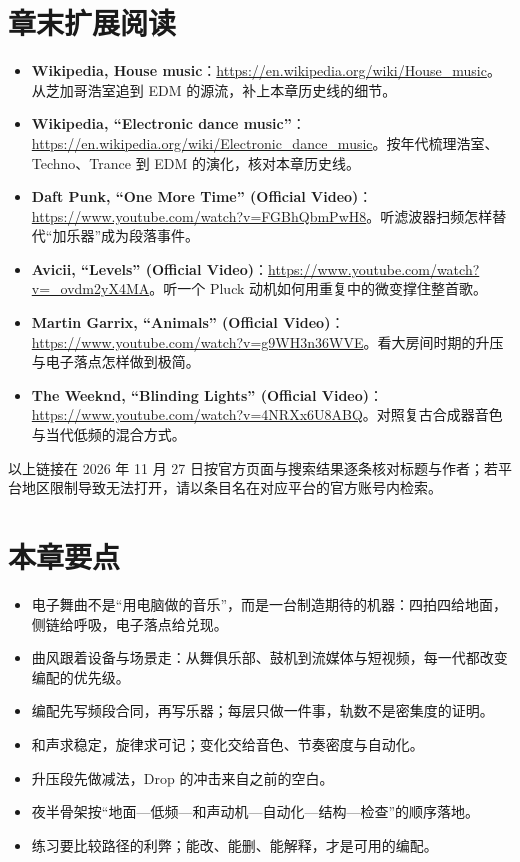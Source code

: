 \section{章末扩展阅读}
\label{sec:edm-reading}

\begin{sloppypar}
\begin{itemize}
\item \textbf{Wikipedia, House music}：\url{https://en.wikipedia.org/wiki/House_music}。从芝加哥浩室追到 EDM 的源流，补上本章历史线的细节。
\item \textbf{Wikipedia, “Electronic dance music”}：\url{https://en.wikipedia.org/wiki/Electronic_dance_music}。按年代梳理浩室、Techno、Trance 到 EDM 的演化，核对本章历史线。
\item \textbf{Daft Punk, “One More Time” (Official Video)}：\url{https://www.youtube.com/watch?v=FGBhQbmPwH8}。听滤波器扫频怎样替代“加乐器”成为段落事件。
\item \textbf{Avicii, “Levels” (Official Video)}：\url{https://www.youtube.com/watch?v=_ovdm2yX4MA}。听一个 Pluck 动机如何用重复中的微变撑住整首歌。
\item \textbf{Martin Garrix, “Animals” (Official Video)}：\url{https://www.youtube.com/watch?v=g9WH3n36WVE}。看大房间时期的升压与电子落点怎样做到极简。
\item \textbf{The Weeknd, “Blinding Lights” (Official Video)}：\url{https://www.youtube.com/watch?v=4NRXx6U8ABQ}。对照复古合成器音色与当代低频的混合方式。
\end{itemize}
\end{sloppypar}

以上链接在 2026 年 11 月 27 日按官方页面与搜索结果逐条核对标题与作者；若平台地区限制导致无法打开，请以条目名在对应平台的官方账号内检索。

\section{本章要点}
\label{sec:edm-takeaways}

\begin{itemize}
\item 电子舞曲不是“用电脑做的音乐”，而是一台制造期待的机器：四拍四给地面，侧链给呼吸，电子落点给兑现。
\item 曲风跟着设备与场景走：从舞俱乐部、鼓机到流媒体与短视频，每一代都改变编配的优先级。
\item 编配先写频段合同，再写乐器；每层只做一件事，轨数不是密集度的证明。
\item 和声求稳定，旋律求可记；变化交给音色、节奏密度与自动化。
\item 升压段先做减法，Drop 的冲击来自之前的空白。
\item 夜半骨架按“地面—低频—和声动机—自动化—结构—检查”的顺序落地。
\item 练习要比较路径的利弊；能改、能删、能解释，才是可用的编配。
\end{itemize}

